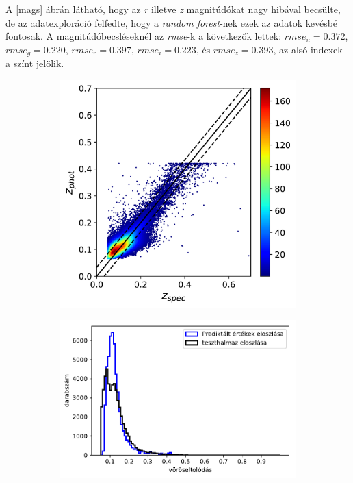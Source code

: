 \documentclass[12pt,letterpaper,twoside,openright]{book}
\begin{document}
 A \ref{mags} ábrán látható, hogy az \textit{r} illetve \textit{z} magnitúdókat nagy hibával becsülte, de az adatexploráció felfedte, hogy a \textit{random forest}-nek ezek az adatok kevésbé fontosak. A magnitúdóbecsléseknél az \textit{rmse}-k a következők lettek: $rmse_u = 0.372$, $rmse_g = 0.220$, $rmse_r = 0.397$, $rmse_i = 0.223$, és $rmse_z = 0.393$, az alsó indexek a színt jelölik. 
 \begin{figure}[]
 \centering
  \begin{subfigure}[b]{0.3\textwidth}
    \includegraphics[width=\textwidth, height = \textwidth]{Figures/pRF.png}
    \label{fig:1}
  \end{subfigure}
  \hspace{1.7cm}
  \begin{subfigure}[b]{0.3\textwidth}
    \includegraphics[width=\textwidth, height = \textwidth]{Figures/histrf.pdf}

\end{subfigure}
\end{figure}
\end{document}
